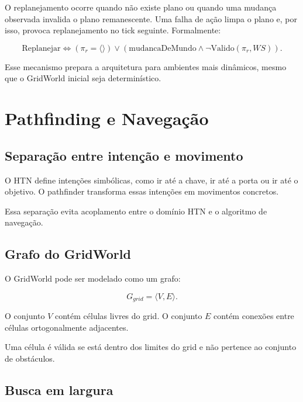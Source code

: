 O replanejamento ocorre quando não existe plano ou quando uma mudança observada
invalida o plano remanescente. Uma falha de ação limpa o plano e, por isso,
provoca replanejamento no tick seguinte. Formalmente:

\begin{equation}
\mathrm{Replanejar}
\iff
(\pi_r=\langle\rangle)
\lor
(\mathrm{mudancaDeMundo}\land\neg\mathrm{Valido}(\pi_r,WS)).
\end{equation}


Esse mecanismo prepara a arquitetura para ambientes mais dinâmicos, mesmo que
o GridWorld inicial seja determinístico.

\chapter{Pathfinding e Navegação}

\section{Separação entre intenção e movimento}

O HTN define intenções simbólicas, como ir até a chave, ir até a porta ou ir
até o objetivo.
O pathfinder transforma essas intenções em movimentos concretos.

Essa separação evita acoplamento entre o domínio HTN e o algoritmo de
navegação.

\section{Grafo do GridWorld}

O GridWorld pode ser modelado como um grafo:

\begin{equation}
G_{grid} = \langle V,E \rangle.
\end{equation}

O conjunto $V$ contém células livres do grid.
O conjunto $E$ contém conexões entre células ortogonalmente adjacentes.

Uma célula é válida se está dentro dos limites do grid e não pertence ao
conjunto de obstáculos.

\section{Busca em largura}

